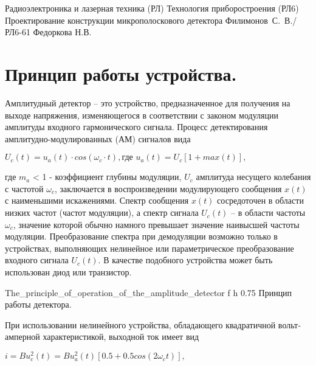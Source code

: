 \documentclass{bmstu}
\begin{document}
	\makecourseworktitle
	{Радиоэлектроника и лазерная техника (РЛ)} %
	{Технология приборостроения (РЛ6)} %
	{Проектирование конструкции микрополоскового детектора} %
	{Филимонов~С.~В./РЛ6-61} %
	{Федоркова Н.В.} %
	{}
	
	\tableofcontents
	
	\chapter{Принцип работы устройства.}
	
	Амплитудный детектор – это устройство, предназначенное для получения на
	выходе напряжения, изменяющегося в соответствии с законом модуляции
	амплитуды входного гармонического сигнала. Процесс детектирования
	амплитудно-модулированных (АМ) сигналов вида
	
	\begin{center}
		 $U_c(t) = u_a(t) \cdot cos(\omega _c \cdot t), \text{где } u_a(t)=U_c[1 + max(t)],$
	\end{center}
	
	где $m_a$ < 1 - коэффициент глубины модуляции, $U_c$ амплитуда несущего 
	колебания с частотой $\omega _c$, заключается в воспроизведении модулирующего 
	сообщения $x(t)$ с наименьшими искажениями. Спектр сообщения $x(t)$ 
	сосредоточен в области низких частот (частот модуляции), а спектр сигнала 
	$U_c(t)$ – в области частоты $\omega _c$, значение которой обычно намного 
	превышает значение наивысшей частоты модуляции. Преобразование спектра при 
	демодуляции возможно только в устройствах, выполняющих нелинейное или 
	параметрическое преобразование входного сигнала $U_c(t)$. В качестве подобного 
	устройства может быть использован диод или транзистор.
	
		{The_principle_of_operation_of_the_amplitude_detector}
		{f} %
		{h} %
		{0.75\textwidth} %
		{Принцип работы детектора.} %
	
	При использовании нелинейного устройства, обладающего квадратичной 
	вольт‐амперной характеристикой, выходной ток имеет вид
	\begin{center}
		$i = B u_c^2(t) = Bu_a^2(t)[0.5 + 0.5 cos(2 \omega _c t)],$
	\end{center}
	
\end{document}
